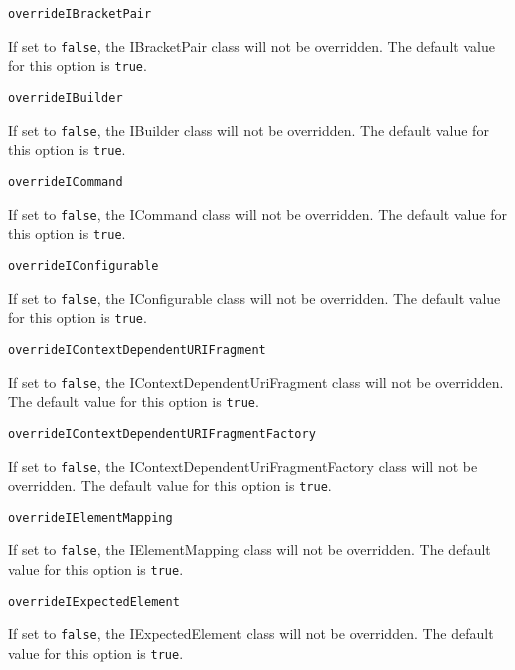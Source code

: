 \noindent\texttt{overrideIBracketPair}
\begin{myindentpar}{1cm}
If set to \texttt{false}, the IBracketPair class will not be overridden. The default value for this option is \texttt{true}.
\end{myindentpar}

\noindent\texttt{overrideIBuilder}
\begin{myindentpar}{1cm}
If set to \texttt{false}, the IBuilder class will not be overridden. The default value for this option is \texttt{true}.
\end{myindentpar}

\noindent\texttt{overrideICommand}
\begin{myindentpar}{1cm}
If set to \texttt{false}, the ICommand class will not be overridden. The default value for this option is \texttt{true}.
\end{myindentpar}

\noindent\texttt{overrideIConfigurable}
\begin{myindentpar}{1cm}
If set to \texttt{false}, the IConfigurable class will not be overridden. The default value for this option is \texttt{true}.
\end{myindentpar}

\noindent\texttt{overrideIContextDependentURIFragment}
\begin{myindentpar}{1cm}
If set to \texttt{false}, the IContextDependentUriFragment class will not be overridden. The default value for this option is \texttt{true}.
\end{myindentpar}

\noindent\texttt{overrideIContextDependentURIFragmentFactory}
\begin{myindentpar}{1cm}
If set to \texttt{false}, the IContextDependentUriFragmentFactory class will not be overridden. The default value for this option is \texttt{true}.
\end{myindentpar}

\noindent\texttt{overrideIElementMapping}
\begin{myindentpar}{1cm}
If set to \texttt{false}, the IElementMapping class will not be overridden. The default value for this option is \texttt{true}.
\end{myindentpar}

\noindent\texttt{overrideIExpectedElement}
\begin{myindentpar}{1cm}
If set to \texttt{false}, the IExpectedElement class will not be overridden. The default value for this option is \texttt{true}.
\end{myindentpar}

